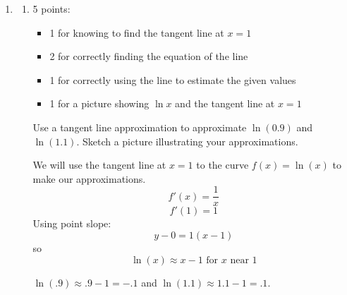 \documentclass{article}
\begin{document}
\begin{enumerate}
\begin{enumerate}
  \end{enumerate}

\item %

  \begin{enumerate}
  \item

    \begin{grading}
      5 points:
      \begin{itemize}[nosep]
      \item 1 for knowing to find the tangent line at $x = 1$
      \item 2 for correctly finding the equation of the line
      \item 1 for correctly using the line to estimate the given values
      \item 1 for a picture showing $\ln x$ and the tangent line at $x = 1$ 
      \end{itemize} 
    \end{grading} 

    \begin{problem}[\nstretch{2}]
      Use a tangent line approximation to approximate $\ln(0.9)$ and $\ln(1.1)$. Sketch a picture illustrating your approximations. 
    \end{problem}

    \begin{solution} 
      We will use the tangent line at $x=1$ to  the curve $f(x) = \ln(x)$ to make our approximations. 
      $$f'(x)= \frac{1}{x}$$  
      $$f'(1) = 1 $$ 
      Using point slope: 
      $$y-0 = 1(x-1)$$ 
      so 
      $$\ln(x) \approx x- 1 \text{ for $x$ near 1} $$ 
      \begin{center} 
          $\ln(.9) \approx .9-1 =-.1$ and $\ln(1.1) \approx1.1-1=.1$.
      \end{center} 

      \begin{center}
      \end{center}
    \end{solution} 


\end{enumerate}
\end{enumerate}
\end{document}
